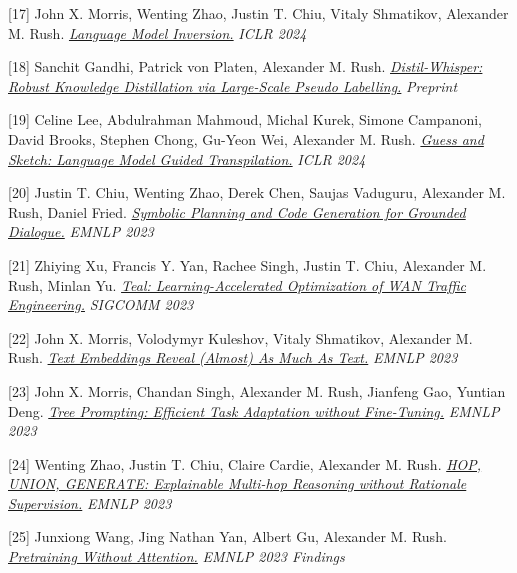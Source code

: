 \documentclass[10pt]{article}
\begin{document}
\medskip


[17] \ind John X. Morris, Wenting Zhao, Justin T. Chiu, Vitaly Shmatikov, Alexander M. Rush. \emph{\href{ https://arxiv.org/abs/2311.13647 }{ Language Model Inversion.} }\emph{ ICLR 2024 }

\medskip


[18] \ind Sanchit Gandhi, Patrick von Platen, Alexander M. Rush. \emph{\href{ https://arxiv.org/abs/2311.00430 }{ Distil-Whisper: Robust Knowledge Distillation via Large-Scale Pseudo Labelling.} }\emph{ Preprint }

\medskip


[19] \ind Celine Lee, Abdulrahman Mahmoud, Michal Kurek, Simone Campanoni, David Brooks, Stephen Chong, Gu-Yeon Wei, Alexander M. Rush. \emph{\href{ https://arxiv.org/pdf/2309.14396.pdf }{ Guess and Sketch: Language Model Guided Transpilation.} }\emph{ ICLR 2024 }

\medskip


[20] \ind Justin T. Chiu, Wenting Zhao, Derek Chen, Saujas Vaduguru, Alexander M. Rush, Daniel Fried. \emph{\href{ https://arxiv.org/pdf/2310.17140.pdf }{ Symbolic Planning and Code Generation for Grounded Dialogue.} }\emph{ EMNLP 2023 }

\medskip


[21] \ind Zhiying Xu, Francis Y. Yan, Rachee Singh, Justin T. Chiu, Alexander M. Rush, Minlan Yu. \emph{\href{ https://arxiv.org/abs/2210.13763 }{ Teal: Learning-Accelerated Optimization of WAN Traffic Engineering.} }\emph{ SIGCOMM 2023 }

\medskip


[22] \ind John X. Morris, Volodymyr Kuleshov, Vitaly Shmatikov, Alexander M. Rush. \emph{\href{ https://arxiv.org/pdf/2310.06816.pdf }{ Text Embeddings Reveal (Almost) As Much As Text.} }\emph{ EMNLP 2023 }

\medskip


[23] \ind John X. Morris, Chandan Singh, Alexander M. Rush, Jianfeng Gao, Yuntian Deng. \emph{\href{ https://arxiv.org/pdf/2310.14034.pdf }{ Tree Prompting: Efficient Task Adaptation without Fine-Tuning.} }\emph{ EMNLP 2023 }

\medskip


[24] \ind Wenting Zhao, Justin T. Chiu, Claire Cardie, Alexander M. Rush. \emph{\href{ https://arxiv.org/pdf/2305.14237.pdf }{ HOP, UNION, GENERATE: Explainable Multi-hop Reasoning without Rationale Supervision.} }\emph{ EMNLP 2023 }

\medskip


[25] \ind Junxiong Wang, Jing Nathan Yan, Albert Gu, Alexander M. Rush. \emph{\href{ https://arxiv.org/pdf/2212.10544.pdf }{ Pretraining Without Attention.} }\emph{ EMNLP 2023 Findings }
\end{document}

